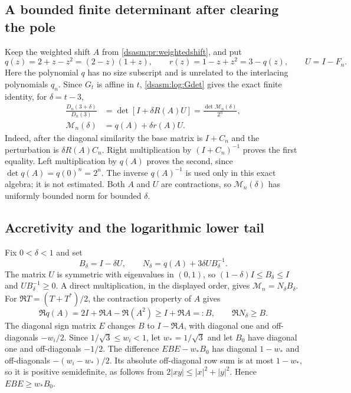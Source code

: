 \documentclass[11pt,letterpaper]{article}
\theoremstyle{remark}\newtheorem{remark}[theorem]{Remark}
\begin{document}
\subsection{A bounded finite determinant after clearing the pole}
Keep the weighted shift $A$ from \eqref{dsasm:pr:weightedshift}, and put
\[
 q(z)=2+z-z^2=(2-z)(1+z),\qquad
 r(z)=1-z+z^2=3-q(z),\qquad U=I-F_n.
\]
Here the polynomial $q$ has no size subscript and is unrelated to the
interlacing polynomials $q_n$. Since $G_t$ is affine in $t$,
\eqref{dsasm:log:Gdet} gives the exact finite identity, for $\delta=t-3$,
\begin{equation}\label{dsasm:pr:poleclear}
\begin{split}
 \frac{D_n(3+\delta)}{D_n(3)}
 &=\det[I+\delta R(A)U]
 =\frac{\det\mathcal M_n(\delta)}{2^n},\\
 \mathcal M_n(\delta)&=q(A)+\delta r(A)U.
\end{split}
\end{equation}
Indeed, after the diagonal similarity the base matrix is $I+C_n$ and
the perturbation is $\delta R(A)C_n$. Right multiplication by
$(I+C_n)^{-1}$ proves the first equality. Left multiplication by
$q(A)$ proves the second, since $\det q(A)=q(0)^n=2^n$.
The inverse $q(A)^{-1}$ is used only in this exact algebra; it is not
estimated. Both $A$ and $U$ are contractions, so
$\mathcal M_n(\delta)$ has uniformly bounded norm for bounded $\delta$.

\subsection{Accretivity and the logarithmic lower tail}
Fix $0<\delta<1$ and set
\[
 B_\delta=I-\delta U,\qquad
 N_\delta=q(A)+3\delta U B_\delta^{-1}.
\]
The matrix $U$ is symmetric with eigenvalues in $(0,1)$, so
$(1-\delta)I\le B_\delta\le I$ and $UB_\delta^{-1}\ge0$.
A direct multiplication, in the displayed order, gives
$\mathcal M_n=N_\delta B_\delta$. For
$\Re T=(T+T^*)/2$, the contraction property of $A$ gives
\begin{equation}\label{dsasm:pr:accretive}
 \Re q(A)=2I+\Re A-\Re(A^2)\ge I+\Re A=:B,
 \qquad \Re N_\delta\ge B.
\end{equation}
The diagonal sign matrix $E$ changes $B$ to $I-\Re A$, with diagonal
one and off-diagonals $-w_i/2$. Since $1/\sqrt3\le w_i<1$, let
$w_*=1/\sqrt3$ and let $B_0$ have diagonal one and off-diagonals
$-1/2$. The difference
$EBE-w_*B_0$ has diagonal $1-w_*$ and off-diagonals
$-(w_i-w_*)/2$. Its absolute off-diagonal row sum is at most
$1-w_*$, so it is positive semidefinite, as follows from
$2|xy|\le|x|^2+|y|^2$. Hence $EBE\ge w_*B_0$.
\end{document}
